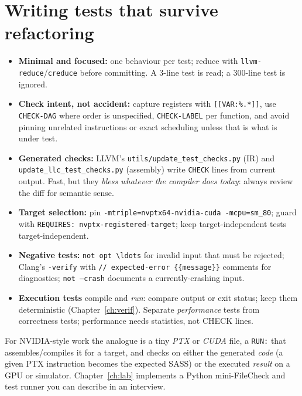 \documentclass[10pt,a4paper,openany,oneside]{report}
\newcommand{\prio}[1]{\texorpdfstring{\ifcase#1\or{\color{gold}\ding{72}}\or{\color{gold}\ding{72}\ding{72}}\or{\color{gold}\ding{72}\ding{72}\ding{72}}\fi}{}}
\begin{document}
\section{Writing tests that survive refactoring \prio{2}}
\begin{mustbox}
\begin{itemize}[nosep]
\item \textbf{Minimal and focused:} one behaviour per test; reduce with \texttt{llvm-reduce}/\texttt{creduce} before committing. A 3-line test is read; a 300-line test is ignored.
\item \textbf{Check intent, not accident:} capture registers with \texttt{[[VAR:\%.*]]}, use \texttt{CHECK-DAG} where order is unspecified, \texttt{CHECK-LABEL} per function, and avoid pinning unrelated instructions or exact scheduling unless that is what is under test.
\item \textbf{Generated checks:} LLVM's \texttt{utils/update\_test\_checks.py} (IR) and \texttt{update\_llc\_test\_checks.py} (assembly) write \texttt{CHECK} lines from current output. Fast, but they \emph{bless whatever the compiler does today}: always review the diff for semantic sense.
\item \textbf{Target selection:} pin \texttt{-mtriple=nvptx64-nvidia-cuda -mcpu=sm\_80}; guard with \texttt{REQUIRES: nvptx-registered-target}; keep target-independent tests target-independent.
\item \textbf{Negative tests:} \texttt{not opt \textbackslash{}ldots} for invalid input that must be rejected; Clang's \texttt{-verify} with \texttt{// expected-error \{\{message\}\}} comments for diagnostics; \texttt{not --crash} documents a currently-crashing input.
\item \textbf{Execution tests} compile and \emph{run}: compare output or exit status; keep them deterministic (Chapter~\ref{ch:verif}). Separate \emph{performance} tests from correctness tests; performance needs statistics, not CHECK lines.
\end{itemize}
\end{mustbox}
For NVIDIA-style work the analogue is a tiny \emph{PTX} or \emph{CUDA} file, a \texttt{RUN:} that assembles/compiles it for a target, and checks on either the generated \emph{code} (a given PTX instruction becomes the expected SASS) or the executed \emph{result} on a GPU or simulator. Chapter~\ref{ch:lab} implements a Python mini-FileCheck and test runner you can describe in an interview.
\end{document}
